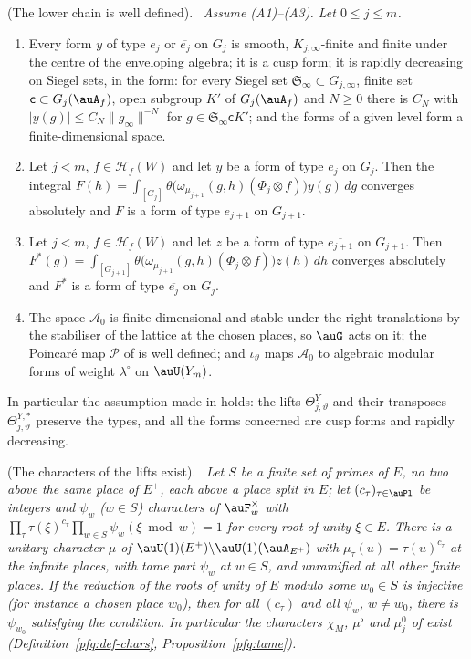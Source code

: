 \documentclass[10pt]{amsart}
\theoremstyle{definition}
\theoremstyle{remark}
\providecommand{\auAz}{\mathcal A_0}
\providecommand{\auP}{\mathcal P}
\providecommand{\psHS}{\mathcal H}
\newenvironment{quotedthm}[2]{\par\medskip\noindent\begingroup
  \textbf{#1}#2.\ \itshape\ignorespaces}{\endgroup\par\medskip}
\begin{document}
\begin{quotedthm}{\cite[Proposition~8.4]{P49}}{ (The lower chain is well defined)}
Assume {\rm(A1)--(A3)}. Let $0\le j\le m$.
\begin{enumerate}
\item[(a)] Every form $y$ of type $e_j$ or $\overline{e_j}$ on $G_j$ is smooth, $K_{j,\infty}$-finite
and finite under the centre of the enveloping algebra; it is a cusp form; it is rapidly
decreasing on Siegel sets, in the form: for every Siegel set $\mathfrak S_\infty\subset G_{j,\infty}$, finite set $\mathsf c\subset G_j(\auA_f)$, open subgroup $K'$ of $G_j(\auA_f)$ and $N\ge0$ there is $C_N$ with $|y(g)|\le C_N\|g_\infty\|^{-N}$ for $g\in\mathfrak S_\infty\mathsf cK'$; and the forms of a given level form a finite-dimensional space.
\item[(b)] Let $j<m$, $f\in\psHS_f(W)$ and let $y$ be a form of type $e_j$ on $G_j$. Then the
integral $F(h)=\int_{[G_j]}\theta\bigl(\omega_{\mu_{j+1}}(g,h)(\Phi_j\otimes f)\bigr)y(g)\,dg$ converges
absolutely and $F$ is a form of type $e_{j+1}$ on $G_{j+1}$.
\item[(c)] Let $j<m$, $f\in\psHS_f(W)$ and let $z$ be a form of type $\overline{e_{j+1}}$ on
$G_{j+1}$. Then $F^*(g)=\int_{[G_{j+1}]}\theta\bigl(\omega_{\mu_{j+1}}(g,h)(\Phi_j\otimes f)\bigr)z(h)
\,dh$ converges absolutely and $F^*$ is a form of type $\overline{e_j}$ on $G_j$.
\item[(d)] The space $\auAz$ is finite-dimensional and stable under the right translations by
the stabiliser of the lattice at the chosen places, so $\auG$ acts on it; the Poincar\'e map
$\auP$ of {\cite[\S14.3]{P46}} is well defined; and $\iota_\vartheta$ maps $\auAz$ to algebraic
modular forms of weight $\lambda^\circ$ on $\auU(Y_m)$.
\end{enumerate}
In particular the assumption made in {\cite[\S5.1.3]{P49}} holds: the lifts $\Theta^Y_{j,\vartheta}$ and
their transposes $\Theta^{Y,*}_{j,\vartheta}$ preserve the types, and all the forms concerned are
cusp forms and rapidly decreasing.
\end{quotedthm}

\begin{quotedthm}{\cite[Lemma~8.6]{P49}}{ (The characters of the lifts exist)}
Let $S$ be a finite set of primes of $E$, no two above the same place of $E^+$, each above a place
split in $E$; let $(c_\tau)_{\tau\in\auPl}$ be integers and $\psi_w$ ($w\in S$) characters of
$\auF_w^\times$ with $\prod_\tau\tau(\xi)^{c_\tau}\prod_{w\in S}\psi_w(\xi\bmod w)=1$ for every root of
unity $\xi\in E$. There is a unitary character $\mu$ of $\auU(1)(E^+)\backslash\auU(1)(\auA_{E^+})$ with
$\mu_\tau(u)=\tau(u)^{c_\tau}$ at the infinite places, with tame part $\psi_w$ at $w\in S$, and
unramified at all other finite places. If the reduction of the roots of unity of $E$ modulo some
$w_0\in S$ is injective (for instance a chosen place $w_0$), then for all $(c_\tau)$ and all $\psi_w$,
$w\ne w_0$, there is $\psi_{w_0}$ satisfying the condition. In particular the characters $\chi_M$,
$\mu^\flat$ and $\mu_j^0$ of {\cite[\S14.3]{P46}} exist (Definition~\ref{pfq:def-chars},
Proposition~\ref{pfq:tame}).
\end{quotedthm}
\end{document}
